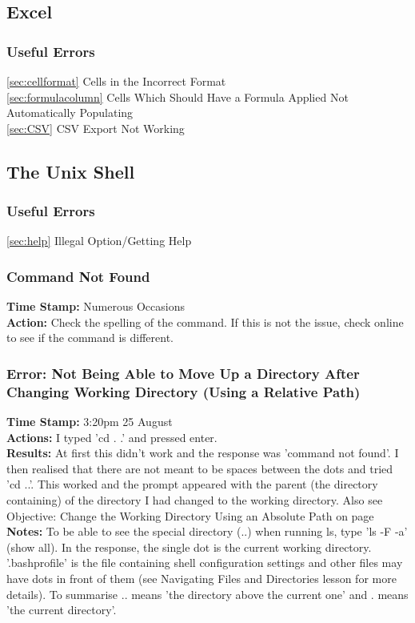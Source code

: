\documentclass{article}
\begin{document}
\begin{FlushLeft}
\subsection{Excel}
\subsubsection{Useful Errors}
\autoref{sec:cellformat} Cells in the Incorrect Format\\
\autoref{sec:formulacolumn} Cells Which Should Have a Formula Applied Not Automatically Populating\\
\autoref{sec:CSV} CSV Export Not Working\\

\subsection{The Unix Shell}
\subsubsection{Useful Errors}
\autoref{sec:help} Illegal Option/Getting Help\\

\subsubsection{Command Not Found}
\textbf{Time Stamp:} Numerous Occasions\\
\textbf{Action:} Check the spelling of the command. If this is not the issue, check online to see if the command is different.\\

\subsubsection{Error: Not Being Able to Move Up a Directory After Changing Working Directory (Using a Relative Path)}
\textbf{Time Stamp:} 3:20pm 25 August\\
\textbf{Actions:} I typed 'cd . .' and pressed enter. \\
\textbf{Results:} At first this didn't work and the response was 'command not found'. I then realised that there are not meant to be spaces between the dots and tried 'cd ..'. This worked and the prompt appeared with the parent (the directory containing) of the directory I had changed to the working directory. Also see Objective: Change the Working Directory Using an Absolute Path on page \pageref{absolute}\\
\textbf{Notes:} To be able to see the special directory (..) when running ls, type 'ls -F -a' (show all). In the response, the single dot is the current working directory. '.bash\textunderscore profile' is the file containing shell configuration settings and other files may have dots in front of them (see Navigating Files and Directories lesson for more details). To summarise .. means 'the directory above the current one' and . means 'the current directory'.


\end{FlushLeft}
\end{document}
